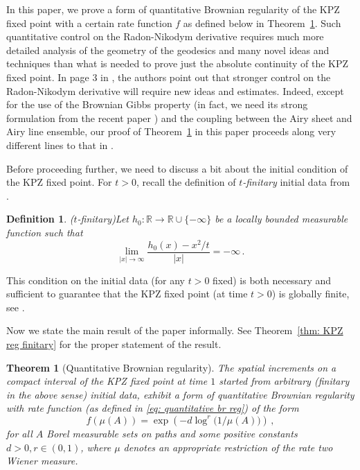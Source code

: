 \documentclass[11pt, reqno]{amsart}
\numberwithin{equation}{section}
\newcounter{dummy} \numberwithin{dummy}{section}
\newtheorem{theorem}[dummy]{Theorem}
\newtheorem{definition}[dummy]{Definition}
\newcommand{\R}{\ensuremath{\mathbb{R}}}
\begin{document}
In this paper, we prove a form of quantitative Brownian regularity of the KPZ fixed point with a certain rate function $f$ as defined below in Theorem~\ref{thm: main informal}. Such quantitative control on the Radon-Nikodym derivative requires much more detailed analysis of the geometry of the geodesics and many novel ideas and techniques than what is needed to prove just the absolute continuity of the KPZ fixed point. In page 3 in \cite{sarkar2021brownian}, the authors point out that stronger control on the Radon-Nikodym derivative will require new ideas and estimates. Indeed,
except for the use of the Brownian Gibbs property (in fact, we need its strong formulation from the recent paper \cite{dauvergne2024wienerdensitiesairyline}) and the coupling between the Airy sheet and Airy line ensemble, our proof of Theorem~\ref{thm: main informal} in this paper proceeds along very different lines to that in \cite{sarkar2021brownian}. 

Before proceeding further, we need to discuss a bit about the initial condition of the KPZ fixed point. For $t>0$, recall the definition of \emph{$t$-finitary} initial data from \cite{sarkar2021brownian}.
\begin{definition}($t$-finitary)\label{def: finitary}
    Let $h_0:\R\to \R \cup \{-\infty\}$ be a locally bounded measurable function such that
    \begin{equation*}
    \displaystyle\lim_{|x|\to \infty}\frac{h_0(x) - x^2/t}{|x|} = -\infty\,.
    \end{equation*}
\end{definition}

This condition on the initial data (for any $t>0$ fixed) is both necessary and sufficient to guarantee that the KPZ fixed point (at time $t>0$) is globally finite, see \cite[Proposition 6.1]{sarkar2021brownian}.

Now we state the main result of the paper informally. See Theorem~\ref{thm: KPZ reg finitary} for the proper statement of the result. 
{
\begin{theorem}[Quantitative Brownian regularity]\label{thm: main informal}
The spatial increments on a compact interval of the KPZ fixed point at time $1$ started from arbitrary (finitary in the above sense) initial data, exhibit a form of quantitative Brownian regularity with rate function (as defined in \eqref{eq: quantitative br reg}) of the form
\begin{equation*}
f(\mu(A))=\exp\left(-d\log^{r}\big(1/\mu(A)\big)\right)\,, 
\end{equation*}
for all $A$ Borel measurable sets on paths and some positive constants  $d>0, r\in (0,1)$, where $\mu$ denotes an appropriate restriction of the rate two Wiener measure. 
\end{theorem}
}
\end{document}
